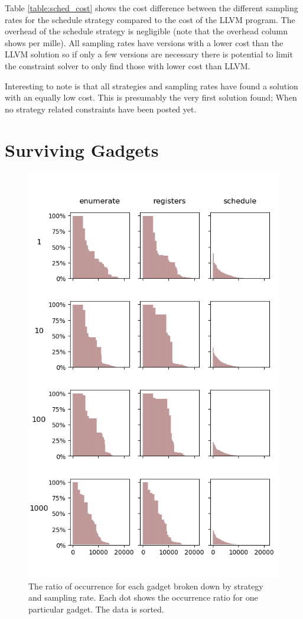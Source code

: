 Table \ref{table:sched_cost} shows the cost difference between the different sampling
rates for the schedule strategy compared to the cost of the LLVM program. The overhead of
the schedule strategy is negligible (note that the overhead column shows per mille). All
sampling rates have versions with a lower cost than the LLVM solution so if only a few
versions are necessary there is potential to limit the constraint solver to only find
those with lower cost than LLVM.

Interesting to note is that all strategies and sampling rates have found a solution with
an equally low cost. This is presumably the very first solution found; When no strategy
related constraints have been posted yet.

\section{Surviving Gadgets}

\begin{figure}[htp]
	\centering
	\includegraphics[width=\textwidth,height=\textheight]{results/figures/gadgets}
	\caption{The ratio of occurrence for each gadget broken down by strategy and sampling rate.
Each dot shows the occurrence ratio for one particular gadget. The data is sorted.}
	\label{fig:gadgets}
\end{figure}


